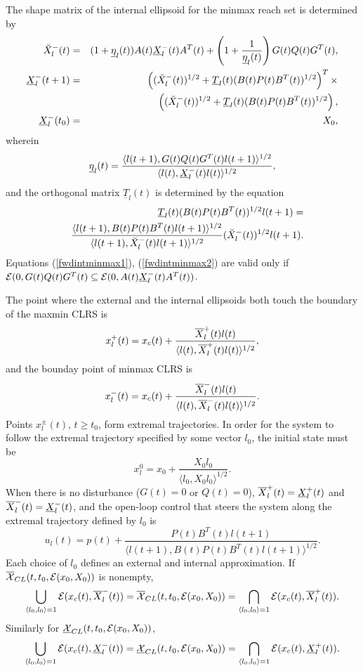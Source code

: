 The shape matrix of the internal ellipsoid for the minmax reach set
is determined by
\begin{eqnarray}
\UUXM(t) & = & (1+\underline{\eta}_l(t))A(t)\UXM(t)A^T(t) +
\left(1+\frac{1}{\underline{\eta}_l(t)}\right)
G(t)Q(t)G^T(t), \label{fwdintminmax1} \\
\UXM(t+1) & = & \left((\UUXM(t))^{1/2} +
\underline{T}_l(t)(B(t)P(t)B^T(t))^{1/2}\right)^T
\times \nonumber \\
& &\left((\UUXM(t))^{1/2} + \underline{T}_l(t)(B(t)P(t)B^T(t))^{1/2}\right),
\label{fwdintminmax2}\\
\UXM(t_0) & = & X_0, \label{fwdintminmax3}
\end{eqnarray}
wherein
\[ \underline{\eta}_l(t) = \frac{\langle l(t+1),
G(t)Q(t)G^T(t)l(t+1)\rangle^{1/2}}{\langle l(t),
\UXM(t)l(t)\rangle^{1/2}}, \]
and the orthogonal matrix $\underline{T}_l(t)$ is determined by the equation
\begin{eqnarray*}
& & \underline{T}_l(t)(B(t)P(t)B^T(t))^{1/2}l(t+1) = \\
& & \frac{\langle l(t+1),
B(t)P(t)B^T(t)l(t+1)\rangle^{1/2}}{\langle l(t+1),
\UUXM(t)l(t+1)\rangle^{1/2}}(\UUXM(t))^{1/2}l(t+1).
\end{eqnarray*}
Equations (\ref{fwdintminmax1}), (\ref{fwdintminmax2}) are valid only if
$\EE(0,G(t)Q(t)G^T(t)\subseteq\EE(0,A(t)\UXM(t)A^T(t))$.

The point where the external and the internal ellipsoids both touch
the boundary of the maxmin CLRS is
\[ x_l^+(t) = x_c(t) + \frac{\OXP(t)l(t)}{\langle l(t),
\OXP(t)l(t)\rangle^{1/2}} ,\]
and the bounday point of minmax CLRS is
\[ x_l^-(t) = x_c(t) + \frac{\OXM(t)l(t)}{\langle l(t),
\OXM(t)l(t)\rangle^{1/2}} .\]
Points $x^{\pm}_l(t)$, $t\geq t_0$, form extremal trajectories.
In order for the system to follow the extremal trajectory specified by
some vector $l_0$, the initial state must be
\begin{equation}
x_l^0 = x_0 + \frac{X_0l_0}{\langle l_0, X_0l_0\rangle^{1/2}}. \label{dx0l}
\end{equation}
When there is no disturbance ($G(t)=0$ or $Q(t)=0$),
$\OXP(t)=\UXP(t)$ and $\OXM(t)=\UXM(t)$, and
the open-loop control that steers the system along the extremal trajectory
defined by $l_0$ is
\begin{equation}
u_l(t) = p(t) + \frac{P(t)B^T(t)l(t+1)}{\langle l(t+1),
B(t)P(t)B^T(t)l(t+1)\rangle^{1/2}}. \label{udt}
\end{equation}
Each choice of $l_0$ defines an external and internal approximation.
If $\OXCL(t,t_0,\EE(x_0,X_0))$ is nonempty, 
\[ \bigcup_{\langle l_0,l_0\rangle=1}\EE(x_c(t),\OXM(t)) =
\OXCL(t,t_0,\EE(x_0,X_0)) =
\bigcap_{\langle l_0,l_0\rangle=1}\EE(x_c(t),\OXP(t)). \]
Similarly for $\UXCL(t,t_0,\EE(x_0,X_0))$,
\[ \bigcup_{\langle l_0,l_0\rangle=1}\EE(x_c(t),\UXM(t)) =
\UXCL(t,t_0,\EE(x_0,X_0)) =
\bigcap_{\langle l_0,l_0\rangle=1}\EE(x_c(t),\UXP(t)). \]






